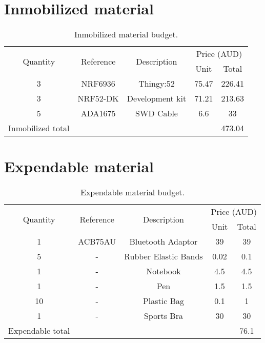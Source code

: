 \section{Inmobilized material}
\begin{table}[htbp!]
	\centering
	\begin{tabular}{*5c}
		\toprule
		\multirow{2}{*}{Quantity} & \multirow{2}{*}{Reference} & \multirow{2}{*}{Description} & \multicolumn{2}{c}{Price (AUD)} \\
		 &  &  & Unit & Total \\
		\midrule
		3 & NRF6936 & Thingy:52 & 75.47 & 226.41\\
		3 & 	NRF52-DK & Development kit & 71.21 & 213.63\\
		5 & 	ADA1675 & SWD Cable & 6.6 & 33 \\
		\midrule
		Inmobilized total& & & & 473.04 \\
		\bottomrule
	\end{tabular}
	\caption{Inmobilized material budget.}
	\label{tb:inmobilized}
\end{table}

\section{Expendable material}
\begin{table}[htbp!]
	\centering
	\begin{tabular}{*5c}
		\toprule
		\multirow{2}{*}{Quantity} & \multirow{2}{*}{Reference} & \multirow{2}{*}{Description} & \multicolumn{2}{c}{Price (AUD)} \\
		 &  &  & Unit & Total \\
		\midrule
		1 & ACB75AU & Bluetooth Adaptor & 39 & 39\\
		5 & - & Rubber Elastic Bands & 0.02 & 0.1\\
		1 & - & Notebook & 4.5 & 4.5\\
		1 & - & Pen & 1.5 & 1.5\\
		10 & - & Plastic Bag & 0.1 & 1\\
		1 & - & Sports Bra & 30 & 30\\
		\midrule
		Expendable total& & & & 76.1 \\
		\bottomrule
	\end{tabular}
	\caption{Expendable material budget.}
	\label{tb:expendable}
\end{table}

